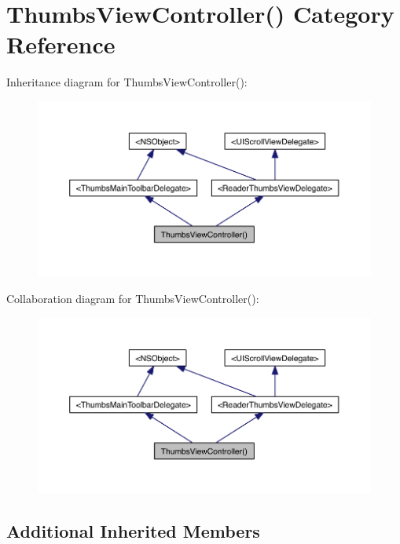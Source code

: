 \hypertarget{category_thumbs_view_controller_07_08}{\section{Thumbs\-View\-Controller() Category Reference}
\label{d3/d8f/category_thumbs_view_controller_07_08}
}


Inheritance diagram for Thumbs\-View\-Controller()\-:
\nopagebreak
\begin{figure}[H]
\begin{center}
\leavevmode
\includegraphics[width=350pt]{db/df6/category_thumbs_view_controller_07_08__inherit__graph}
\end{center}
\end{figure}


Collaboration diagram for Thumbs\-View\-Controller()\-:
\nopagebreak
\begin{figure}[H]
\begin{center}
\leavevmode
\includegraphics[width=350pt]{d3/d8b/category_thumbs_view_controller_07_08__coll__graph}
\end{center}
\end{figure}
\subsection*{Additional Inherited Members}


